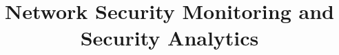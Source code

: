\documentclass[twoside]{hcmut-report}
\title{Network Security Monitoring and Security Analytics}
\begin{document}
\coverpage

\tableofcontents















\appendix

\end{document}
